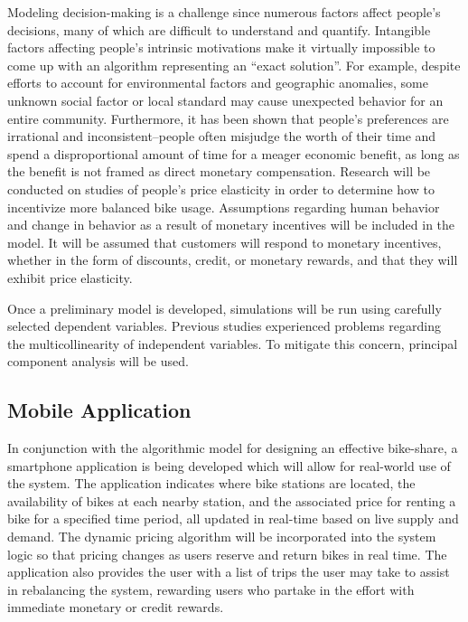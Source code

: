 \documentclass{sig-alternate}
\begin{document}
Modeling decision-making is a challenge since numerous factors affect people's decisions, many of which are difficult to understand and quantify. Intangible factors affecting people's intrinsic motivations make it virtually impossible to come up with an algorithm representing an ``exact solution''. For example, despite efforts to account for environmental factors and geographic anomalies, some unknown social factor or local standard may cause unexpected behavior for an entire community. Furthermore, it has been shown that people's preferences are irrational and inconsistent--people often misjudge the worth of their time and spend a disproportional amount of time for a meager economic benefit, as long as the benefit is not framed as direct monetary compensation. Research will be conducted on studies of people's price elasticity in order to determine how to incentivize more balanced bike usage. Assumptions regarding human behavior and change in behavior as a result of monetary incentives will be included in the model. It will be assumed that customers will respond to monetary incentives, whether in the form of discounts, credit, or monetary rewards, and that they will exhibit price elasticity.\newline

Once a preliminary model is developed, simulations will be run using carefully selected dependent variables. Previous studies experienced problems regarding the multicollinearity of independent variables. To mitigate this concern, principal component analysis will be used.

\subsection{Mobile Application}
In conjunction with the algorithmic model for designing an effective bike-share, a smartphone application is being developed which will allow for real-world use of the system. The application indicates where bike stations are located, the availability of bikes at each nearby station, and the associated price for renting a bike for a specified time period, all updated in real-time based on live supply and demand. The dynamic pricing algorithm will be incorporated into the system logic so that pricing changes as users reserve and return bikes in real time. The application also provides the user with a list of trips the user may take to assist in rebalancing the system, rewarding users who partake in the effort with immediate monetary or credit rewards. \newline
\end{document}

